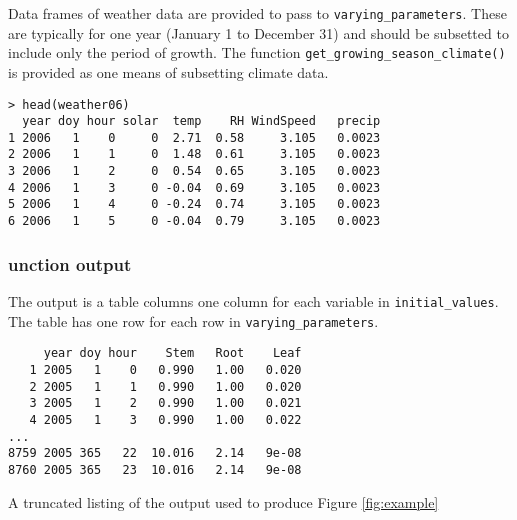 \documentclass{article}
\newcommand{\code}[1]{\texttt{#1}}
\begin{document}
Data frames of weather data are provided to pass to \code{varying\_parameters}. These are typically for one year (January 1 to December 31) and should be subsetted to include only the period of growth. The function \code{get\_growing\_season\_climate()} is provided as one means of subsetting climate data.

\begin{center}
\begin{lstlisting}
> head(weather06)
  year doy hour solar  temp    RH WindSpeed   precip
1 2006   1    0     0  2.71  0.58     3.105   0.0023
2 2006   1    1     0  1.48  0.61     3.105   0.0023
3 2006   1    2     0  0.54  0.65     3.105   0.0023
4 2006   1    3     0 -0.04  0.69     3.105   0.0023
5 2006   1    4     0 -0.24  0.74     3.105   0.0023
6 2006   1    5     0 -0.04  0.79     3.105   0.0023
\end{lstlisting}
\end{center}

\subsubsection{unction output}
The output  is a  table  columns  one column for each variable in \code{initial\_values}. The table has one row for each row in \code{varying\_parameters}.

\begin{table}[!htbp]
\begin{center}
\begin{lstlisting}
     year doy hour    Stem   Root    Leaf
   1 2005   1    0   0.990   1.00   0.020
   2 2005   1    1   0.990   1.00   0.020
   3 2005   1    2   0.990   1.00   0.021
   4 2005   1    3   0.990   1.00   0.022
...
8759 2005 365   22  10.016   2.14   9e-08
8760 2005 365   23  10.016   2.14   9e-08
\end{lstlisting}
\caption{\label{tab:example_output} A truncated listing of the output used to produce Figure \ref{fig:example}}
\end{center}
\end{table}
\end{document}
